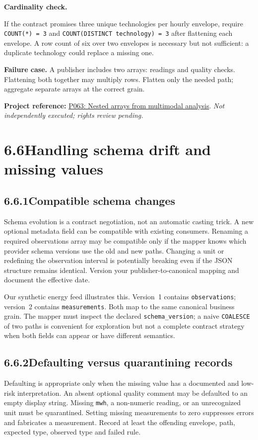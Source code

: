 \documentclass[11pt,twoside]{article}
\newcommand{\topic}[2]{\subsection*{#1\quad #2}}
\newcommand{\repo}[2]{\par\begingroup\fontsize{8.0}{9.6}\selectfont\sffamily\color{inkgray}\textbf{Project reference:} \href{#2}{#1}. \textit{Not independently executed; rights review pending.}\par\endgroup}
\begin{document}
\begin{insight}\textbf{Cardinality check.}\par
If the contract promises three unique technologies per hourly envelope, require \texttt{COUNT(*) = 3} and \texttt{COUNT(DISTINCT technology) = 3} after flattening each envelope. A row count of six over two envelopes is necessary but not sufficient: a duplicate technology could replace a missing one.\end{insight}
\textbf{Failure case.} A publisher includes two arrays: readings and quality checks. Flattening both together may multiply rows. Flatten only the needed path; aggregate separate arrays at the correct grain.
\repo{P063: Nested arrays from multimodal analysis}{https://github.com/Snowflake-Labs/sfguide-extracting-insights-from-video-with-multimodal-ai-analysis}
\newpage
\section*{6.6\quad Handling schema drift and missing values}
\topic{6.6.1}{Compatible schema changes}
Schema evolution is a contract negotiation, not an automatic casting trick. A new optional metadata field can be compatible with existing consumers. Renaming a required observations array may be compatible only if the mapper knows which provider schema versions use the old and new paths. Changing a unit or redefining the observation interval is potentially breaking even if the JSON structure remains identical. Version your publisher-to-canonical mapping and document the effective date.

Our synthetic energy feed illustrates this. Version~1 contains \texttt{observations}; version~2 contains \texttt{measurements}. Both map to the same canonical business grain. The mapper must inspect the declared \texttt{schema\_version}; a naive \texttt{COALESCE} of two paths is convenient for exploration but not a complete contract strategy when both fields can appear or have different semantics.

\topic{6.6.2}{Defaulting versus quarantining records}
Defaulting is appropriate only when the missing value has a documented and low-risk interpretation. An absent optional quality comment may be defaulted to an empty display string. Missing \texttt{mwh}, a non-numeric reading, or an unrecognized unit must be quarantined. Setting missing measurements to zero suppresses errors and fabricates a measurement. Record at least the offending envelope, path, expected type, observed type and failed rule.
\end{document}
